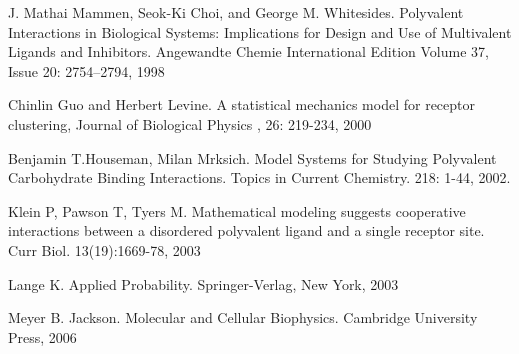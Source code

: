\documentclass[10pt]{article}
\def\Summary#1#2#3#4{\vspace{2mm}{\textbf{Summary}}\vspace{2mm}\newline{\textbf{#1}}\newline{\emph{#2}}\newline{#3}\newline{{\emph{Keywords:\ }}#4}}
\begin{document}
%
\begin{thebibliography}{100}

 J. Mathai Mammen, Seok-Ki Choi, and George M. Whitesides. Polyvalent Interactions in Biological Systems: Implications for Design and Use of Multivalent Ligands and Inhibitors. Angewandte Chemie International Edition Volume 37, Issue 20:  2754–2794,  1998

 Chinlin Guo and Herbert Levine. A statistical mechanics model for receptor clustering, Journal of Biological Physics , 26: 219-234, 2000

 Benjamin T.Houseman, Milan Mrksich. Model Systems for Studying Polyvalent Carbohydrate Binding Interactions. Topics in Current Chemistry. 218: 1-44, 2002.

 Klein P, Pawson T, Tyers M. Mathematical modeling suggests cooperative interactions between a disordered polyvalent ligand and a single receptor site. Curr Biol. 13(19):1669-78, 2003 

 Lange K.  Applied Probability. Springer-Verlag, New York, 2003


 Meyer B. Jackson. Molecular and Cellular Biophysics.  Cambridge University Press, 2006


\end{thebibliography}
\end{document}
